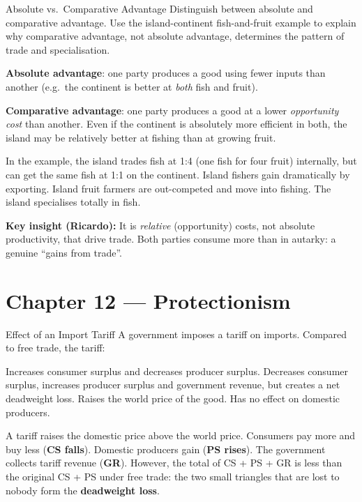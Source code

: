 \documentclass[paper=a5]{scrartcl}
\begin{document}
\begin{question}[type=open]{Absolute vs.\ Comparative Advantage}
Distinguish between absolute and comparative advantage. Use the island-continent
fish-and-fruit example to explain why comparative advantage, not absolute
advantage, determines the pattern of trade and specialisation.

\answerlines[7]

\begin{solution}
  \textbf{Absolute advantage}: one party produces a good using fewer inputs
  than another (e.g.\ the continent is better at \emph{both} fish and fruit).

  \textbf{Comparative advantage}: one party produces a good at a lower
  \emph{opportunity cost} than another. Even if the continent is absolutely
  more efficient in both, the island may be relatively better at fishing than
  at growing fruit.

  In the example, the island trades fish at 1:4 (one fish for four fruit)
  internally, but can get the same fish at 1:1 on the continent. Island fishers
  gain dramatically by exporting. Island fruit farmers are out-competed and
  move into fishing. The island specialises totally in fish.

  \textbf{Key insight (Ricardo):} It is \emph{relative} (opportunity) costs,
  not absolute productivity, that drive trade. Both parties consume more than
  in autarky: a genuine ``gains from trade''.
\end{solution}
\end{question}


\section{Chapter 12 — Protectionism}

\begin{question}[type=mc]{Effect of an Import Tariff}
A government imposes a tariff on imports. Compared to free trade, the tariff:
\begin{choices}
  \choice        Increases consumer surplus and decreases producer surplus.
  \correctchoice Decreases consumer surplus, increases producer surplus and
                 government revenue, but creates a net deadweight loss.
  \choice        Raises the world price of the good.
  \choice        Has no effect on domestic producers.
\end{choices}
\begin{solution}
  A tariff raises the domestic price above the world price. Consumers pay more
  and buy less (\textbf{CS falls}). Domestic producers gain (\textbf{PS rises}).
  The government collects tariff revenue (\textbf{GR}). However, the total of
  CS + PS + GR is less than the original CS + PS under free trade: the two
  small triangles that are lost to nobody form the \textbf{deadweight loss}.
\end{solution}
\end{question}
\end{document}
